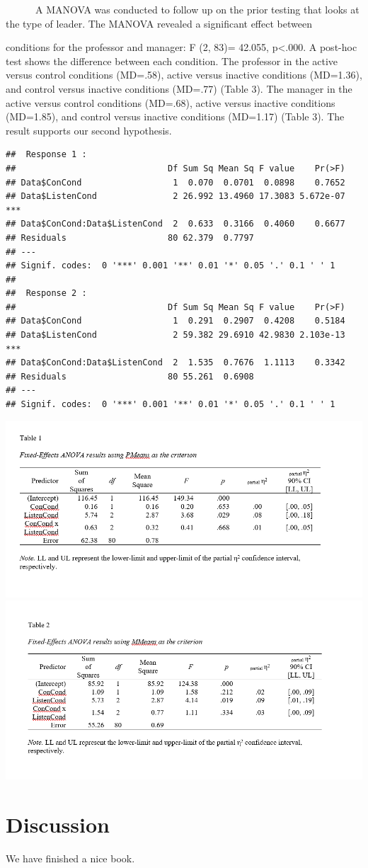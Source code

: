 \documentclass[
  12pt,
]{article}
\begin{document}
~~~~~~A MANOVA was conducted to follow up on the prior testing that looks at the type of leader. The MANOVA revealed a significant effect between

conditions for the professor and manager: F (2, 83)= 42.055, p\textless.000. A post-hoc test shows the difference between each condition. The professor in the active versus control conditions (MD=.58), active versus inactive conditions (MD=1.36), and control versus inactive conditions (MD=.77) (Table 3). The manager in the active versus control conditions (MD=.68), active versus inactive conditions (MD=1.85), and control versus inactive conditions (MD=1.17) (Table 3). The result supports our second hypothesis.

\begin{verbatim}
##  Response 1 :
##                              Df Sum Sq Mean Sq F value    Pr(>F)    
## Data$ConCond                  1  0.070  0.0701  0.0898    0.7652    
## Data$ListenCond               2 26.992 13.4960 17.3083 5.672e-07 ***
## Data$ConCond:Data$ListenCond  2  0.633  0.3166  0.4060    0.6677    
## Residuals                    80 62.379  0.7797                      
## ---
## Signif. codes:  0 '***' 0.001 '**' 0.01 '*' 0.05 '.' 0.1 ' ' 1
## 
##  Response 2 :
##                              Df Sum Sq Mean Sq F value    Pr(>F)    
## Data$ConCond                  1  0.291  0.2907  0.4208    0.5184    
## Data$ListenCond               2 59.382 29.6910 42.9830 2.103e-13 ***
## Data$ConCond:Data$ListenCond  2  1.535  0.7676  1.1113    0.3342    
## Residuals                    80 55.261  0.6908                      
## ---
## Signif. codes:  0 '***' 0.001 '**' 0.01 '*' 0.05 '.' 0.1 ' ' 1
\end{verbatim}

\includegraphics[width=13.46in]{Files/Table 1}
\includegraphics[width=13.78in]{Files/Table 2}

\hypertarget{discussion}{%
\section{Discussion}\label{discussion}}

We have finished a nice book.

  
\end{document}
